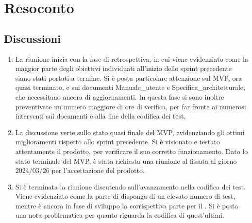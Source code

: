 \section{Resoconto} \label{sec:resoconto}
\subsection{Discussioni} \label{subsec:resdiscussione}
\begin{enumerate}
     \item La riunione inizia con la fase di retrospettiva, in cui viene evidenziato come la maggior parte degli obiettivi individuati all'inizio dello sprint precedente siano stati portati a termine. Si è posta particolare attenzione sul MVP, ora quasi terminato, e sui documenti Manuale\_utente e Specifica\_architetturale, che necessitano ancora di aggiornamenti. In questa fase si sono inoltre preventivate un numero maggiore di ore di verifica, per far fronte ai numerosi interventi sui documenti e alla fine della codifica dei test.
    \item La discussione verte sullo stato quasi finale del MVP, evidenziando gli ottimi miglioramenti rispetto allo sprint precedente. Si è visionato e testato attentamente il prodotto, per verificare il suo corretto funzionamento. Dato lo stato terminale del MVP, è stata richiesta una riunione al  fissata al giorno 2024/03/26 per l'accettazione del prodotto.
    \item Si è terminata la riunione discutendo sull'avanzamento nella codifica dei test. Viene evidenziato come la parte di  disponga di un elevato numero di test, mentre è ancora in fase di sviluppo la corrispettiva parte per il . Si è posta una nota problematica per quanto riguarda la codifica di quest'ultimi.
\end{enumerate}


